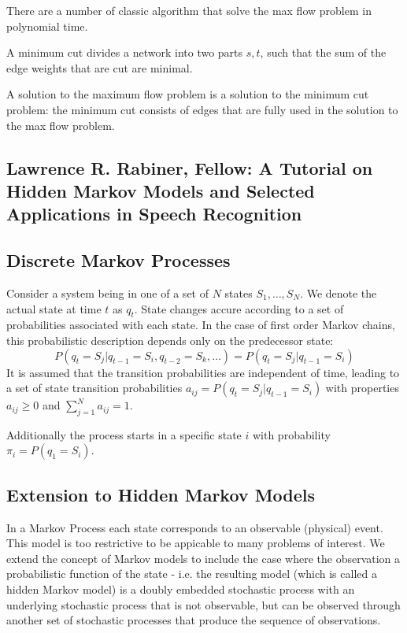\documentclass{scrartcl}
\begin{document}
There are a number of classic algorithm that solve the max flow problem in polynomial time.

A minimum cut divides a network into two parts \(s, t\), such that the sum of the edge weights that are cut are minimal.

A solution to the maximum flow problem is a solution to the minimum cut problem: the minimum cut consists of edges that are fully used in the solution to the max flow problem.

\newpage
\begin{appendices}

\section{Lawrence R. Rabiner, Fellow: A Tutorial on Hidden Markov Models and Selected Applications in Speech Recognition}
\subsection{Discrete Markov Processes}
Consider a system being in one of a set of \(N\) states \(S_1, \dots, S_N\). We denote the actual state at time \(t\) as \(q_t\). State changes accure according to a set of probabilities associated with each state. In the case of first order Markov chains, this probabilistic description depends only on the predecessor state:
\[P(q_t = S_j | q_{t-1} = S_i, q_{t-2} = S_k, \dots) = P(q_t = S_j | q_{t-1} = S_i)\]
It is assumed that the transition probabilities are independent of time, leading to a set of state transition probabilities \(a_{ij} = P(q_t = S_j | q_{t-1} = S_i)\) with properties \(a_{ij} \geq 0\) and \(\sum_{j=1}^N a_{ij} = 1\).

Additionally the process starts in a specific state \(i\) with probability \(\pi_i = P(q_1 = S_i)\).

\subsection{Extension to Hidden Markov Models}
In a Markov Process each state corresponds to an observable (physical) event. This model is too restrictive to be appicable to many problems of interest. We extend the concept of Markov models to include the case where the observation a probabilistic function of the state - i.e. the resulting model (which is called a hidden Markov model) is a doubly embedded stochastic process with an underlying stochastic process that is not observable, but can be observed through another set of stochastic processes that produce the sequence of observations. 


\end{appendices}
\end{document}
